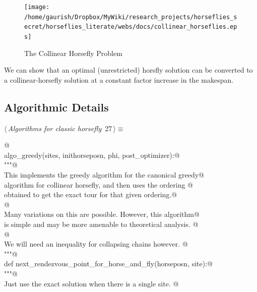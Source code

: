 \documentclass[11.5pt]{report}
\begin{document}
\begin{figure}[H]
\centering
    \texttt{[image: /home/gaurish/Dropbox/MyWiki/research\_projects/horseflies\_secret/horseflies\_literate/webs/docs/collinear\_horseflies.eps]}
    \caption{The Collinear Horsefly Problem}
    \label{fig:collinear-horseflies}
\end{figure}

We can show that an optimal (unrestricted) horsfly solution can be converted
to a collinear-horsefly solution at a constant factor increase in the makespan. 

\subsection{Algorithmic Details}
\begin{flushleft} \small\label{scrap20}\raggedright\small
{} $\langle\,${\itshape Algorithms for classic horsefly}\nobreak\ {\footnotesize {27}}$\,\rangle\equiv$
\vspace{-1ex}
\begin{list}{}{} \item
\mbox{}\verb@   @\\
\mbox{}\verb@def algo_greedy(sites, inithorseposn, phi, post_optimizer):@\\
\mbox{}\verb@      """@\\
\mbox{}\verb@      This implements the greedy algorithm for the canonical greedy@\\
\mbox{}\verb@      algorithm for collinear horsefly, and then uses the ordering @\\
\mbox{}\verb@      obtained to get the exact tour for that given ordering.@\\
\mbox{}\verb@      @\\
\mbox{}\verb@      Many variations on this are possible. However, this algorithm@\\
\mbox{}\verb@      is simple and may be more amenable to theoretical analysis. @\\
\mbox{}\verb@      @\\
\mbox{}\verb@      We will need an inequality for collapsing chains however. @\\
\mbox{}\verb@      """@\\
\mbox{}\verb@      def next_rendezvous_point_for_horse_and_fly(horseposn, site):@\\
\mbox{}\verb@            """@\\
\mbox{}\verb@            Just use the exact solution when there is a single site. @\\

\end{list}
\end{flushleft}
\end{document}
